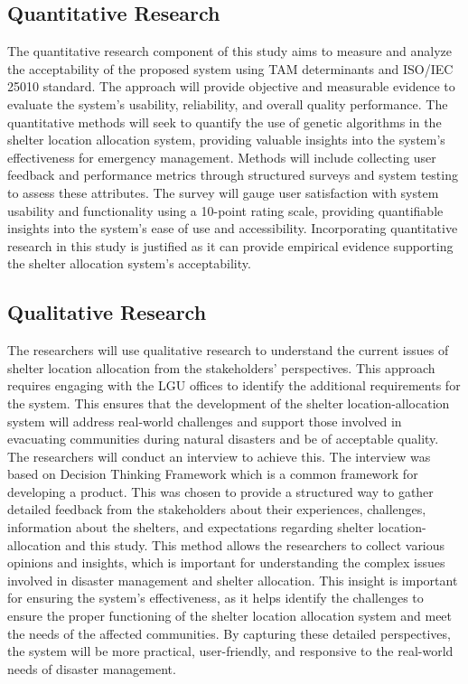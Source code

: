 \subsection{Quantitative Research}
	The quantitative research component of this study aims to measure and analyze the acceptability of the proposed system using TAM determinants and ISO/IEC 25010 standard. The approach will provide objective and measurable evidence to evaluate the system's usability, reliability, and overall quality performance. The quantitative methods will seek to quantify the use of genetic algorithms in the shelter location allocation system, providing valuable insights into the system's effectiveness for emergency management.
	Methods will include collecting user feedback and performance metrics through structured surveys and system testing to assess these attributes. The survey will gauge user satisfaction with system usability and functionality using a 10-point rating scale, providing quantifiable insights into the system's ease of use and accessibility. 
	Incorporating quantitative research in this study is justified as it can provide empirical evidence supporting the shelter allocation system's acceptability. 

\subsection{Qualitative Research}
	The researchers will use qualitative research to understand the current issues of shelter location allocation from the stakeholders' perspectives. This approach requires engaging with the LGU offices to identify the additional requirements for the system. This ensures that the development of the shelter location-allocation system will address real-world challenges and support those involved in evacuating communities during natural disasters and be of acceptable quality.
	The researchers will conduct an interview to achieve this. The interview was based on Decision Thinking Framework which is a common framework for developing a product. This was chosen to provide a structured way to gather detailed feedback from the stakeholders about their experiences, challenges, information about the shelters, and expectations regarding shelter location-allocation and this study. This method allows the researchers to collect various opinions and insights, which is important for understanding the complex issues involved in disaster management and shelter allocation.
	This insight is important for ensuring the system's effectiveness, as it helps identify the challenges to ensure the proper functioning of the shelter location allocation system and meet the needs of the affected communities. By capturing these detailed perspectives, the system will be more practical, user-friendly, and responsive to the real-world needs of disaster management.

